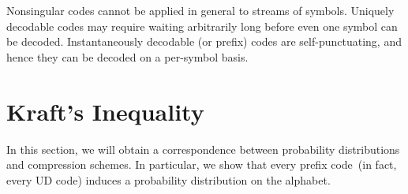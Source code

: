     \begin{remark}
        \label{remark:types-of-codes-1}
        Nonsingular codes cannot be applied in general to streams of symbols. Uniquely decodable codes may require waiting arbitrarily long before even one symbol can be decoded. Instantaneously decodable (or prefix) codes are self-punctuating, and hence they can be decoded on a per-symbol basis. 
    \end{remark}


\section{Kraft's Inequality} 
\label{sec:kraft}
    In this section, we will obtain a correspondence between probability distributions and compression schemes. In particular, we show that every prefix code~(in fact, every UD code) induces a probability distribution on the alphabet.

